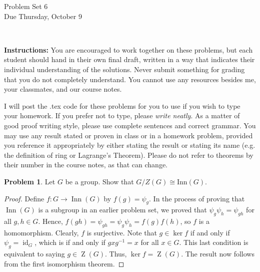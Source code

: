 \documentclass[11pt]{article}
\title{}
\date{\vspace{-0.5in}}
\theoremstyle{definition}
\newtheorem{problem}{Problem}
\begin{document}
\thispagestyle{fancy}
\pagestyle{fancy}

\vspace{3em}

\begin{center}
	{\LARGE Problem Set 6 \\}
	Due Thursday, October 9
\end{center}

\

\noindent
{\bf Instructions:}
You are encouraged to work together on these problems, but each student should hand in their own final draft, written in a way that indicates their individual understanding of the solutions. Never submit something for grading that you do not completely understand. You cannot use any resources besides me, your classmates, and our course notes.


I will post the .tex code for these problems for you to use if you wish to type your homework. If you prefer not to type, please  {\em write neatly}. As a matter of good proof writing style, please use complete sentences and correct grammar. You may use any result stated or proven in class or in a homework problem, provided you reference it appropriately by either stating the result or stating its name (e.g. the definition of ring or Lagrange's Theorem). Please do not refer to theorems by their number in the course notes, as that can change.


\smallskip

\begin{problem}
Let $G$ be a group. Show that $G/Z(G) \cong \mathrm{Inn}(G)$.
\end{problem}

\begin{proof}
Define $f:G\to \operatorname{Inn}(G)$ by $f(g)=\psi_g$.  In the process of proving that $\operatorname{Inn}(G)$ is a subgroup in an earlier problem set, we proved that $\psi_g\psi_h=\psi_{gh}$ for all $g,h\in G$.  Hence, $f(gh)=\psi_{gh}=\psi_g\psi_h=f(g)f(h)$, so $f$ is a homomorphism.  Clearly, $f$ is surjective.  Note that $g\in \ker f$ if and only if $\psi_g=\operatorname{id}_G$, which is if and only if $gxg^{-1}=x$ for all $x\in G$.  This last condition is equivalent to saying $g\in \operatorname{Z}(G)$.  Thus, $\ker f=\operatorname{Z}(G)$.  The result now follows from the first isomorphism theorem.
\end{proof}
\end{document}
